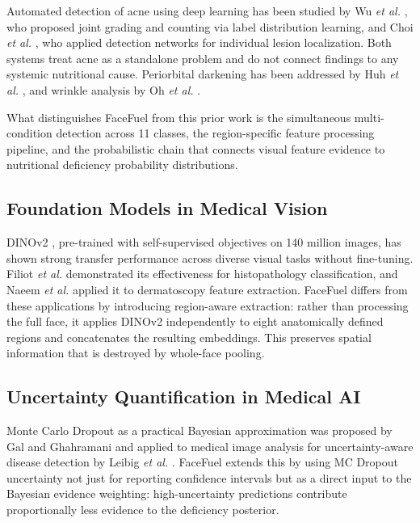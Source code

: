 \documentclass[journal]{IEEEtran}
\begin{document}
Automated detection of acne using deep learning has been studied by
Wu \textit{et al.} \cite{wu2019}, who proposed joint grading and counting
via label distribution learning, and Choi \textit{et al.} \cite{choi2019},
who applied detection networks for individual lesion localization.
Both systems treat acne as a standalone problem and do not connect findings
to any systemic nutritional cause. Periorbital darkening has been addressed
by Huh \textit{et al.} \cite{huh2019}, and wrinkle analysis by
Oh \textit{et al.} \cite{oh2016}.

What distinguishes FaceFuel from this prior work is the simultaneous
multi-condition detection across 11 classes, the region-specific feature
processing pipeline, and the probabilistic chain that connects visual feature
evidence to nutritional deficiency probability distributions.

\subsection{Foundation Models in Medical Vision}

DINOv2 \cite{oquab2024}, pre-trained with self-supervised objectives on
140 million images, has shown strong transfer performance across diverse
visual tasks without fine-tuning. Filiot \textit{et al.} \cite{filiot2023}
demonstrated its effectiveness for histopathology classification, and
Naeem \textit{et al.} \cite{naeem2024} applied it to dermatoscopy feature
extraction. FaceFuel differs from these applications by introducing
region-aware extraction: rather than processing the full face, it applies
DINOv2 independently to eight anatomically defined regions and concatenates
the resulting embeddings. This preserves spatial information that is
destroyed by whole-face pooling.

\subsection{Uncertainty Quantification in Medical AI}

Monte Carlo Dropout as a practical Bayesian approximation was proposed by
Gal and Ghahramani \cite{gal2016} and applied to medical image analysis
for uncertainty-aware disease detection by Leibig \textit{et al.} \cite{leibig2017}.
FaceFuel extends this by using MC Dropout uncertainty not just for reporting
confidence intervals but as a direct input to the Bayesian evidence weighting:
high-uncertainty predictions contribute proportionally less evidence to the
deficiency posterior.
\end{document}
